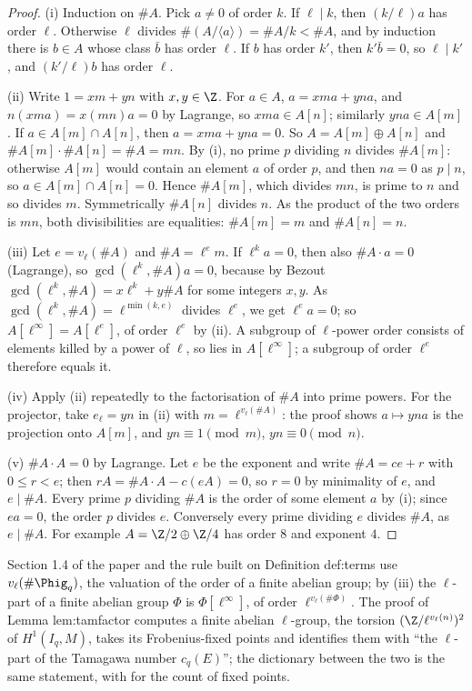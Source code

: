 \begin{proof}
(i) Induction on $\#A$. Pick $a\ne0$ of order $k$. If $\ell\mid k$, then $(k/\ell)a$ has order $\ell$. Otherwise $\ell$ divides
$\#(A/\langle a\rangle)=\#A/k<\#A$, and by induction there is $b\in A$ whose class $\bar b$ has order $\ell$. If $b$ has order $k'$, then
$k'\bar b=0$, so $\ell\mid k'$, and $(k'/\ell)b$ has order $\ell$.

(ii) Write $1=xm+yn$ with $x,y\in\Z$. For $a\in A$, $a=xma+yna$, and $n(xma)=x(mn)a=0$ by Lagrange, so $xma\in A[n]$; similarly $yna\in A[m]$.
If $a\in A[m]\cap A[n]$, then $a=xma+yna=0$. So $A=A[m]\oplus A[n]$ and $\#A[m]\cdot\#A[n]=\#A=mn$. By (i), no prime $p$ dividing $n$ divides
$\#A[m]$: otherwise $A[m]$ would contain an element $a$ of order $p$, and then $na=0$ as $p\mid n$, so $a\in A[m]\cap A[n]=0$. Hence $\#A[m]$, which divides
$mn$, is prime to $n$ and so divides $m$. Symmetrically $\#A[n]$ divides $n$. As the product of the two orders is $mn$, both divisibilities are equalities:
$\#A[m]=m$ and $\#A[n]=n$.

(iii) Let $e=v_\ell(\#A)$ and $\#A=\ell^em$. If $\ell^ka=0$, then also $\#A\cdot a=0$ (Lagrange), so $\gcd(\ell^k,\#A)a=0$, because by Bezout
$\gcd(\ell^k,\#A)=x\ell^k+y\#A$ for some integers $x,y$. As $\gcd(\ell^k,\#A)=\ell^{\min(k,e)}$ divides $\ell^e$, we get $\ell^ea=0$; so $A[\ell^\infty]=A[\ell^e]$, of
order $\ell^e$ by (ii). A subgroup of $\ell$-power order consists of elements killed by a power of $\ell$, so lies in $A[\ell^\infty]$; a
subgroup of order $\ell^e$ therefore equals it.

(iv) Apply (ii) repeatedly to the factorisation of $\#A$ into prime powers. For the projector, take $e_\ell=y n$ in (ii) with
$m=\ell^{v_\ell(\#A)}$: the proof shows $a\mapsto yna$ is the projection onto $A[m]$, and $yn\equiv1\pmod m$, $yn\equiv0\pmod n$.

(v) $\#A\cdot A=0$ by Lagrange. Let $e$ be the exponent and write $\#A=ce+r$ with $0\le r<e$; then $rA=\#A\cdot A-c(eA)=0$, so $r=0$ by minimality of
$e$, and $e\mid\#A$. Every prime $p$ dividing $\#A$ is the order of some element $a$ by (i); since $ea=0$, the order $p$ divides $e$. Conversely every prime
dividing $e$ divides $\#A$, as $e\mid\#A$. For example $A=\Z/2\oplus\Z/4$ has order $8$ and exponent $4$.
\end{proof}

\begin{paperlink}
Section 1.4 of the paper and the rule built on Definition def:terms use $v_\ell(\#\Phig_q)$, the valuation of the order of a finite abelian group; by
(iii) the $\ell$-part of a finite abelian group $\Phi$ is $\Phi[\ell^\infty]$, of order $\ell^{v_\ell(\#\Phi)}$. The proof
of Lemma lem:tamfactor computes a finite abelian $\ell$-group, the torsion $(\Z/\ell^{v_\ell(n)})^2$ of $H^1(I_q,M)$, takes its Frobenius-fixed points and
identifies them with ``the $\ell$-part of the Tamagawa number $c_q(E)$''; the dictionary between the two is the same statement, with
 for the count of fixed points.
\end{paperlink}

